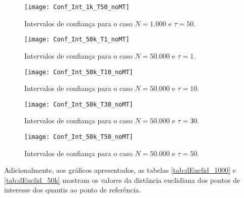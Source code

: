 \begin{figure}
	\centering
	\texttt{[image: Conf\_Int\_1k\_T50\_noMT]}
	\caption{Intervalos de confiança para o caso $N=1.000$ e $\tau=50$.}\label{Fig:Conf_Int_1k_T50}
\end{figure}

\begin{figure}
	\centering
	\texttt{[image: Conf\_Int\_50k\_T1\_noMT]}
	\caption{Intervalos de confiança para o caso $N=50.000$ e $\tau=1$.}\label{Fig:Conf_Int_50k_T1}
\end{figure}

\begin{figure}
	\centering
	\texttt{[image: Conf\_Int\_50k\_T10\_noMT]}
	\caption{Intervalos de confiança para o caso $N=50.000$ e $\tau=10$.}\label{Fig:Conf_Int_50k_T10}
\end{figure}

\begin{figure}
	\centering
	\texttt{[image: Conf\_Int\_50k\_T30\_noMT]}
	\caption{Intervalos de confiança para o caso $N=50.000$ e $\tau=30$.}\label{Fig:Conf_Int_50k_30}
\end{figure}

\begin{figure}
	\centering
	\texttt{[image: Conf\_Int\_50k\_T50\_noMT]}
	\caption{Intervalos de confiança para o caso $N=50.000$ e $\tau=50$.}\label{Fig:Conf_Int_50k_T50}
\end{figure}

Adicionalmente, aos gráficos apresentados, as tabelas \ref{tab:dEuclid_1000} e \ref{tab:dEuclid_50k} mostram os valores da distância euclidiana dos pontos de interesse dos quantis ao ponto de referência.

